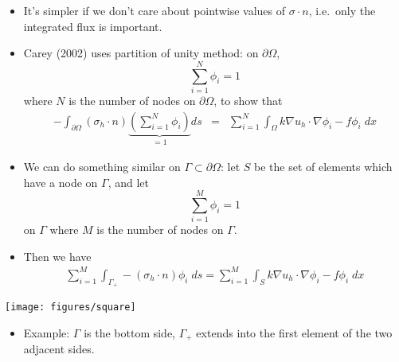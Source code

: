 \documentclass[
  compress
  ,12pt
]{beamer}
\begin{document}
\begin{frame}
      \begin{itemize}
      \item{
        It's simpler if we don't care about pointwise values of $\sigma \cdot n$,
	i.e.\ only the integrated flux is
	important.}

      \item{Carey (2002) uses partition of unity method: on $\partial \Omega$,
	\begin{equation}
	  \nonumber
	  \sum_{i=1}^N \phi_i = 1
	\end{equation}
	where $N$ is the number of nodes on $\partial \Omega$, to show that
	\begin{eqnarray}
	  \nonumber
	  -\int_{\partial \Omega} \left(\sigma_h \cdot n\right)
	   \underbrace{\left(\sum_{i=1}^N \phi_i \right)}_{=1} ds &=&
	\sum_{i=1}^N \int_{\Omega} k\nabla u_h \cdot \nabla \phi_i - f\phi_i \;dx
	\end{eqnarray}
      }
      \end{itemize}
\end{frame}




\begin{frame}
      \begin{itemize}
      \item{
        We can do something similar on $\Gamma \subset \partial \Omega$: let $S$ be the set of elements
	which have a node on $\Gamma$, and let
	\begin{equation}
	  \nonumber
	  \sum_{i=1}^M \phi_i = 1 
	\end{equation}
	on $\Gamma$ where $M$ is the number of nodes on $\Gamma$.
      }
	
      \item{
	Then we have
	\begin{eqnarray}
	  \nonumber
	  \sum_{i=1}^M \int_{\Gamma_{+}}-\left(\sigma_h\cdot n\right)  \phi_i \;ds =
	  \sum_{i=1}^M \int_{S} k\nabla u_h \cdot \nabla \phi_i - f\phi_i \;dx 
	\end{eqnarray}
      }
      \end{itemize}
\end{frame}


\begin{frame}
  \begin{center}
    \texttt{[image: figures/square]}    
  \end{center}

      \begin{itemize}
      \item{
        Example: $\Gamma$ is the bottom side, $\Gamma_{+}$ extends into the first element
	of the two adjacent sides.
	}
      \end{itemize}
\end{frame}
\end{document}
